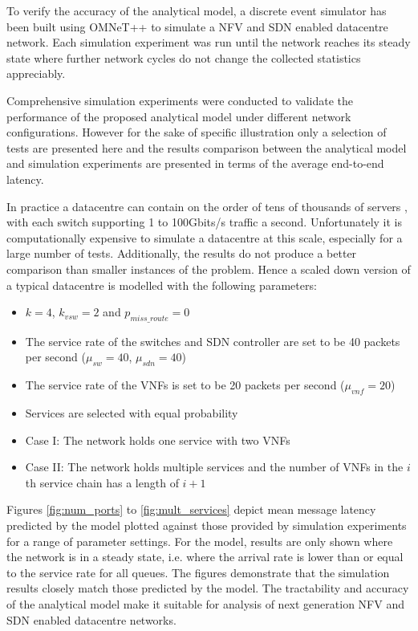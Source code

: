 To verify the accuracy of the analytical model, a discrete event simulator has been built using OMNeT++ \cite{VargaH08} to simulate a NFV and SDN enabled datacentre network. Each simulation experiment was run until the network reaches its steady state where further network cycles do not change the collected statistics appreciably.

Comprehensive simulation experiments were conducted to validate the performance of the proposed analytical model under different network configurations. However for the sake of specific illustration only a selection of tests are presented here and the results comparison between the analytical model and simulation experiments are presented in terms of the average end-to-end latency.

In practice a datacentre can contain on the order of tens of thousands of servers \cite{AWS16}, with each switch supporting 1 to 100Gbits/s traffic a second. Unfortunately it is computationally expensive to simulate a datacentre at this scale, especially for a large number of tests. Additionally, the results do not produce a better comparison than smaller instances of the problem. Hence a scaled down version of a typical datacentre is modelled with the following parameters:

\begin{itemize}
\item $k = 4$, $k_{vsw} = 2$ and $p_{miss\_route} = 0$
\item The service rate of the switches and SDN controller are set to be 40 packets per second ($\mu_{sw} = 40$, $\mu_{sdn} = 40$)
\item The service rate of the VNFs is set to be 20 packets per second ($\mu_{vnf} = 20$)
\item Services are selected with equal probability
\item Case I: The network holds one service with two VNFs
\item Case II: The network holds multiple services and the number of VNFs in the $i$th service chain has a length of $i+1$
\end{itemize}

Figures \ref{fig:num_ports} to \ref{fig:mult_services} depict mean message latency predicted by the model plotted against those provided by simulation experiments for a range of parameter settings. For the model, results are only shown where the network is in a steady state, i.e. where the arrival rate is lower than or equal to the service rate for all queues. The figures demonstrate that the simulation results closely match those predicted by the model. The tractability and accuracy of the analytical model make it suitable for analysis of next generation NFV and SDN enabled datacentre networks.